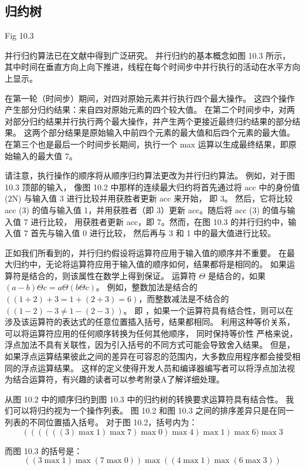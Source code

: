 \subsection{归约树}
{\color{red} Fig 10.3}

并行归约算法已在文献中得到广泛研究。 并行归约的基本概念如图 10.3 所示，
其中时间在垂直方向上向下推进，线程在每个时间步中并行执行的活动在水平方向上显示。

在第一轮（时间步）期间，对四对原始元素并行执行四个最大操作。 这四个操作产生部分归约结果：来自四对原始元素的四个较大值。 
在第二个时间步中，对两对部分归约结果并行执行两个最大操作，并产生两个更接近最终归约结果的部分结果。 
这两个部分结果是原始输入中前四个元素的最大值和后四个元素的最大值。 
在第三个也是最后一个时间步长期间，执行一个 max 运算以生成最终结果，即原始输入的最大值 7。

请注意，执行操作的顺序将从顺序归约算法更改为并行归约算法。 
例如，对于图 10.3 顶部的输入，
像图 10.2 中那样的连续最大归约将首先通过将 acc 中的身份值 (2N) 与输入值 3 进行比较并用获胜者更新 acc 来开始， 即 3。
然后，它将比较 acc (3) 的值与输入值 1，并用获胜者（即 3）更新 acc。随后将 acc (3) 的值与输入值 7 进行比较， 
用获胜者更新 acc，即 7。然而，在图 10.3 的并行归约中，输入值 7 首先与输入值 0 进行比较，
然后再与 3 和 1 中的最大值进行比较。

正如我们所看到的，并行归约假设将运算符应用于输入值的顺序并不重要。 
在最大归约中，无论将运算符应用于输入值的顺序如何，结果都将是相同的。 如果运算符是结合的，则该属性在数学上得到保证。 
运算符 $\Theta$ 是结合的，如果 $(a-b) \Theta c=a \Theta(b \Theta c)$。 
例如，整数加法是结合的 $((1+2)+3=1+(2+3)=6)$，而整数减法是不结合的 $((1-2)-3 \neq 1-(2-3))$。
即 ，如果一个运算符具有结合性，则可以在涉及该运算符的表达式的任意位置插入括号，结果都相同。
利用这种等价关系，可以将运算符应用的任何顺序转换为任何其他顺序，
同时保持等价性 严格来说，浮点加法不具有关联性，因为引入括号的不同方式可能会导致舍入结果。
但是，如果浮点运算结果彼此之间的差异在可容忍的范围内，大多数应用程序都会接受相同的浮点运算结果。 
这样的定义使得开发人员和编译器编写者可以将浮点加法视为结合运算符，有兴趣的读者可以参考附录A了解详细处理。

从图 10.2 中的顺序归约到图 10.3 中的归约树的转换要求运算符具有结合性。 我们可以将归约视为一个操作列表。 
图 10.2 和图 10.3 之间的排序差异只是在同一列表的不同位置插入括号。 对于图 10.2，括号内为：
$$
((((((3)\max 1) \max 7) \max 0) \max 4) \max 1) \max 6) \max 3
$$

而图 10.3 的括号是：
$$
((3 \max 1) \max (7 \max 0)) \max ((4 \max 1) \max (6 \max 3))
$$

